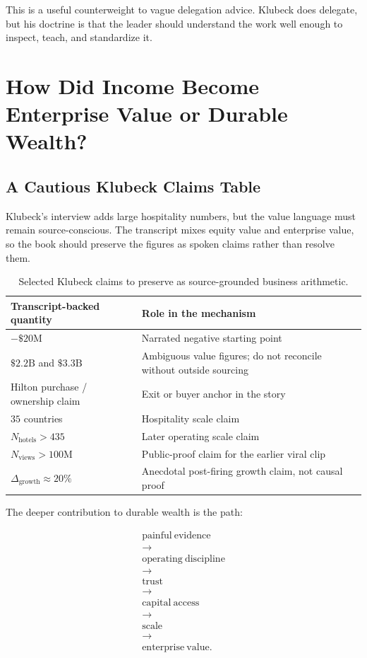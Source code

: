 \documentclass[11pt,oneside]{book}
\begin{document}
This is a useful counterweight to vague delegation advice. Klubeck does delegate, but his doctrine is that the leader should understand the work well enough to inspect, teach, and standardize it.

\chapter{How Did Income Become Enterprise Value or Durable Wealth?}

\section{A Cautious Klubeck Claims Table}

Klubeck's interview adds large hospitality numbers, but the value language must remain source-conscious. The transcript mixes equity value and enterprise value, so the book should preserve the figures as spoken claims rather than resolve them.

\begin{table}
\centering
\begin{tabular}{|p{.42\linewidth}|p{.44\linewidth}|}
\hline
Transcript-backed quantity & Role in the mechanism\\
\hline
\(-\$20\mathrm{M}\) & Narrated negative starting point\\
\hline
\(\$2.2\mathrm{B}\) and \(\$3.3\mathrm{B}\) & Ambiguous value figures; do not reconcile without outside sourcing\\
\hline
Hilton purchase / ownership claim & Exit or buyer anchor in the story\\
\hline
\(35\) countries & Hospitality scale claim\\
\hline
\(N_{\mathrm{hotels}}>435\) & Later operating scale claim\\
\hline
\(N_{\mathrm{views}}>100\mathrm{M}\) & Public-proof claim for the earlier viral clip\\
\hline
\(\Delta_{\mathrm{growth}}\approx20\%\) & Anecdotal post-firing growth claim, not causal proof\\
\hline
\end{tabular}
\caption{Selected Klubeck claims to preserve as source-grounded business arithmetic.}
\end{table}

The deeper contribution to durable wealth is the path:

\begin{equation}
\begin{gathered}
\mathrm{painful\ evidence}\\
\rightarrow\\
\mathrm{operating\ discipline}\\
\rightarrow\\
\mathrm{trust}\\
\rightarrow\\
\mathrm{capital\ access}\\
\rightarrow\\
\mathrm{scale}\\
\rightarrow\\
\mathrm{enterprise\ value}.
\end{gathered}
\end{equation}
\end{document}
